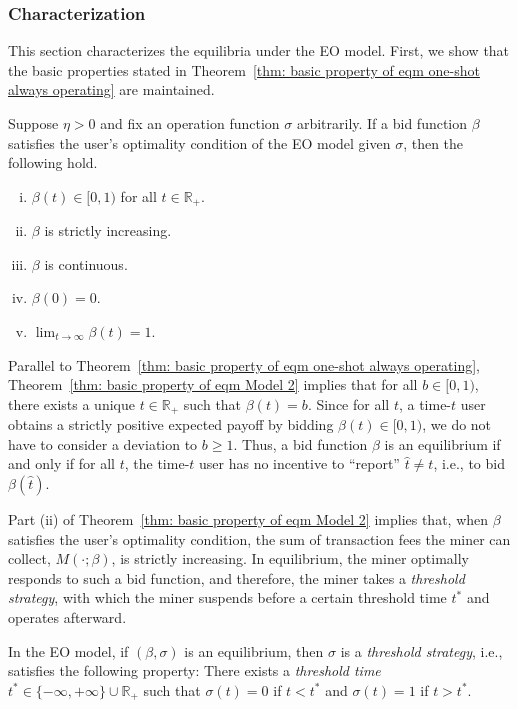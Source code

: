 \documentclass[12pt, letterpaper]{article}
\begin{document}
\subsubsection{Characterization}

This section characterizes the equilibria under the EO model. First, we show that the basic properties stated in Theorem~\ref{thm: basic property of eqm one-shot always operating} are maintained.

\begin{thm}\label{thm: basic property of eqm Model 2}
    Suppose $\eta>0$ and fix an operation function $\sigma$ arbitrarily. If a bid function $\beta$ satisfies the user's optimality condition of the EO model given $\sigma$, then the following hold.
    \begin{enumerate}[(i)]
        \item $\beta(t) \in [0, 1)$ for all $t \in \mathbb{R}_+$.
        \item $\beta$ is strictly increasing.
        \item $\beta$ is continuous.
        \item $\beta(0) = 0$.
        \item $\lim_{t \to \infty} \beta(t) = 1$.
    \end{enumerate}
\end{thm}


Parallel to Theorem~\ref{thm: basic property of eqm one-shot always operating}, Theorem~\ref{thm: basic property of eqm Model 2} implies that for all $b \in [0, 1)$, there exists a unique $t \in \mathbb{R}_+$ such that $\beta(t) = b$. Since for all $t$, a time-$t$ user obtains a strictly positive expected payoff by bidding $\beta(t) \in [0, 1)$, we do not have to consider a deviation to $b \ge 1$. Thus, a bid function $\beta$ is an equilibrium if and only if for all $t$, the time-$t$ user has no incentive to ``report'' $\hat{t} \neq t$, i.e., to bid $\beta(\hat{t})$.

Part (ii) of Theorem~\ref{thm: basic property of eqm Model 2} implies that, when $\beta$ satisfies the user's optimality condition, the sum of transaction fees the miner can collect, $M(\cdot; \beta)$, is strictly increasing. In equilibrium, the miner optimally responds to such a bid function, and therefore, the miner takes a \emph{threshold strategy}, with which the miner suspends before a certain threshold time $t^*$ and operates afterward.

\begin{lem}\label{lem: optimality of threshold strategy}
    In the EO model, if $(\beta, \sigma)$ is an equilibrium, then $\sigma$ is a \emph{threshold strategy}, i.e., satisfies the following property:
    There exists a \emph{threshold time} $t^* \in \{-\infty, +\infty\} \cup \mathbb{R}_+$ such that $\sigma(t) = 0$ if $t < t^*$ and $\sigma(t) = 1$ if $t > t^*$.
\end{lem}
\end{document}
